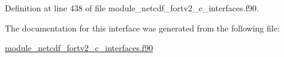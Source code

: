 Definition at line 438 of file module\+\_\+netcdf\+\_\+fortv2\+\_\+c\+\_\+interfaces.\+f90.



The documentation for this interface was generated from the following file\+:\begin{DoxyCompactItemize}
\item 
\hyperlink{module__netcdf__fortv2__c__interfaces_8f90}{module\+\_\+netcdf\+\_\+fortv2\+\_\+c\+\_\+interfaces.\+f90}\end{DoxyCompactItemize}

